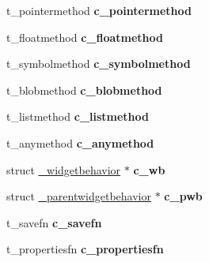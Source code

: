 \begin{DoxyCompactItemize}
\item 
\hypertarget{struct__class_aeac3aaff359d25928881171adf61a160}{t\-\_\-pointermethod {\bfseries c\-\_\-pointermethod}}\label{struct__class_aeac3aaff359d25928881171adf61a160}

\item 
\hypertarget{struct__class_a782147fd5d533a3e6ccb639a11ebe715}{t\-\_\-floatmethod {\bfseries c\-\_\-floatmethod}}\label{struct__class_a782147fd5d533a3e6ccb639a11ebe715}

\item 
\hypertarget{struct__class_aa478a5ab0f0f648e1c91a0f42c14f55f}{t\-\_\-symbolmethod {\bfseries c\-\_\-symbolmethod}}\label{struct__class_aa478a5ab0f0f648e1c91a0f42c14f55f}

\item 
\hypertarget{struct__class_ac2f69f4816d901040cbf2ea190219362}{t\-\_\-blobmethod {\bfseries c\-\_\-blobmethod}}\label{struct__class_ac2f69f4816d901040cbf2ea190219362}

\item 
\hypertarget{struct__class_a6fcd1eb2b7571f712284332c227a14b4}{t\-\_\-listmethod {\bfseries c\-\_\-listmethod}}\label{struct__class_a6fcd1eb2b7571f712284332c227a14b4}

\item 
\hypertarget{struct__class_a213cb4ba65fc39cd9cb6a4791098200b}{t\-\_\-anymethod {\bfseries c\-\_\-anymethod}}\label{struct__class_a213cb4ba65fc39cd9cb6a4791098200b}

\item 
\hypertarget{struct__class_a798a11afd53ee561de67ade396d2a19d}{struct \hyperlink{struct__widgetbehavior}{\-\_\-widgetbehavior} $\ast$ {\bfseries c\-\_\-wb}}\label{struct__class_a798a11afd53ee561de67ade396d2a19d}

\item 
\hypertarget{struct__class_a318ae82b45fe6d2d1b5533df6726fb06}{struct \hyperlink{struct__parentwidgetbehavior}{\-\_\-parentwidgetbehavior} $\ast$ {\bfseries c\-\_\-pwb}}\label{struct__class_a318ae82b45fe6d2d1b5533df6726fb06}

\item 
\hypertarget{struct__class_a5c9574ec9b2a7ef518a81098dd46ff12}{t\-\_\-savefn {\bfseries c\-\_\-savefn}}\label{struct__class_a5c9574ec9b2a7ef518a81098dd46ff12}

\item 
\hypertarget{struct__class_a1cbd5b90e1567a09e2f8e2c99ebafbc3}{t\-\_\-propertiesfn {\bfseries c\-\_\-propertiesfn}}\label{struct__class_a1cbd5b90e1567a09e2f8e2c99ebafbc3}


\end{DoxyCompactItemize}
